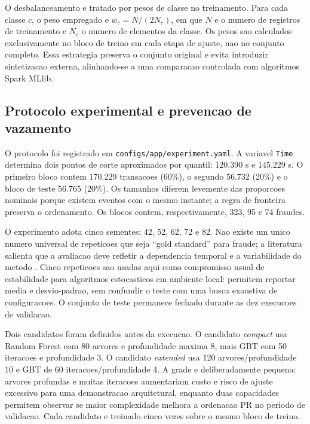 \documentclass[10pt,twocolumn]{article}
\begin{document}
O desbalanceamento e tratado por pesos de classe no treinamento. Para cada classe $c$, o peso empregado e $w_c=N/(2N_c)$, em que $N$ e o numero de registros de treinamento e $N_c$ o numero de elementos da classe. Os pesos sao calculados exclusivamente no bloco de treino em cada etapa de ajuste, nao no conjunto completo. Essa estrategia preserva o conjunto original e evita introduzir sintetizacao externa, alinhando-se a uma comparacao controlada com algoritmos Spark MLlib.

\subsection{Protocolo experimental e prevencao de vazamento}

O protocolo foi registrado em \texttt{configs/app/experiment.yaml}. A variavel \texttt{Time} determina dois pontos de corte aproximados por quantil: 120.390 s e 145.229 s. O primeiro bloco contem 170.229 transacoes (60\%), o segundo 56.732 (20\%) e o bloco de teste 56.765 (20\%). Os tamanhos diferem levemente das proporcoes nominais porque existem eventos com o mesmo instante; a regra de fronteira preserva o ordenamento. Os blocos contem, respectivamente, 323, 95 e 74 fraudes.

O experimento adota cinco sementes: 42, 52, 62, 72 e 82. Nao existe um unico numero universal de repeticoes que seja ``gold standard'' para fraude; a literatura salienta que a avaliacao deve refletir a dependencia temporal e a variabilidade do metodo \cite{dalpozzolo2018,hand2009}. Cinco repeticoes sao usadas aqui como compromisso usual de estabilidade para algoritmos estocasticos em ambiente local: permitem reportar media e desvio-padrao, sem confundir o teste com uma busca exaustiva de configuracoes. O conjunto de teste permanece fechado durante as dez execucoes de validacao.

Dois candidatos foram definidos antes da execucao. O candidato \textit{compact} usa Random Forest com 80 arvores e profundidade maxima 8, mais GBT com 50 iteracoes e profundidade 3. O candidato \textit{extended} usa 120 arvores/profundidade 10 e GBT de 60 iteracoes/profundidade 4. A grade e deliberadamente pequena: arvores profundas e muitas iteracoes aumentariam custo e risco de ajuste excessivo para uma demonstracao arquitetural, enquanto duas capacidades permitem observar se maior complexidade melhora a ordenacao PR no periodo de validacao. Cada candidato e treinado cinco vezes sobre o mesmo bloco de treino.
\end{document}
